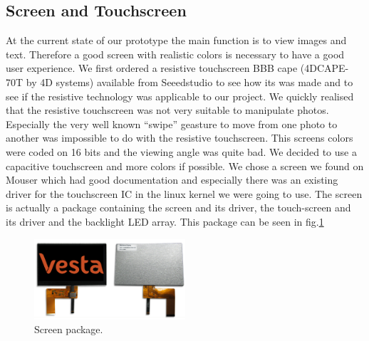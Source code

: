 \clearpage


\subsection{Screen and Touchscreen}
At the current state of our prototype the main function is to view images and text. Therefore a good screen with realistic colors is necessary to have a good user experience.
We first ordered a resistive touchscreen BBB cape (4DCAPE-70T by 4D systems) available from Seeedstudio to see how its was made and to see if the resistive technology was applicable to our project. We quickly realised that the resistive touchscreen was not very suitable to manipulate photos. Especially the very well known “swipe” geasture to move from one photo to another was impossible to do with the resistive touchscreen.
This screens colors were coded on 16 bits and the viewing angle was quite bad. We decided to use a capacitive touchscreen and more colors if possible. We chose a screen we found on Mouser which had good documentation and especially there was an existing driver for the touchscreen IC in the linux kernel we were going to use.
 The screen is actually a package containing the screen and its driver, the touch-screen and its driver and the backlight LED array. This package can be seen in fig.\ref{fig:screen package}

 \begin{figure}[!htb]
     \centering
     \includegraphics[width=0.5\textwidth,keepaspectratio]{chap/hardFig/newhaven_screen_image}
     \caption{Screen package.}
     \label{fig:screen package}
 \end{figure}


